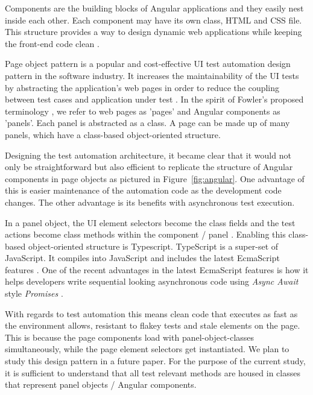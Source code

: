 \documentclass[conference]{IEEEtran}
\begin{document}
	Components are the building blocks of Angular applications and they easily nest inside each other.
	Each component may have its own class, HTML and CSS file. This structure provides a way to design dynamic web applications while keeping the front-end code clean \cite{wiki:angular}. 

	Page object pattern is a popular and cost-effective UI test automation design pattern in the software industry.
	It increases the maintainability of the UI tests by abstracting the application's web pages in order to reduce the coupling between test cases and application under test \cite{leotta2013improving}.
	In the spirit of Fowler's proposed terminology \cite{fowler:pageobject}, we refer to web pages as 'pages' and Angular components as 'panels'.
	Each panel is abstracted as a class. A page can be made up of many panels, which have a class-based object-oriented structure.   

	Designing the test automation architecture, it became clear that it would not only be straightforward but also efficient to replicate the structure of Angular components in page objects as pictured in Figure~\ref{fig:angular}.
	One advantage of this is easier maintenance of the automation code as the development code changes.
	The other advantage is its benefits with asynchronous test execution.

	In a panel object, the UI element selectors become the class fields and the test actions become class methods within the component / panel \cite{protractorstyleguide}.
	Enabling this class-based object-oriented structure is Typescript.
	TypeScript is a super-set of JavaScript. It compiles into JavaScript and includes the latest EcmaScript features \cite{wiki:typescript}.
	One of the recent advantages in the latest EcmaScript features is how it helps developers write sequential looking asynchronous code using \emph{Async Await} style \emph{Promises} \cite{wiki:ECMAscript}.

	With regards to test automation this means clean code that executes as fast as the environment allows, resistant to flakey tests \cite{fowler:flake} and stale elements on the page. 
	This is because the page components load with panel-object-classes simultaneously, while the page element selectors get instantiated.
	We plan to study this design pattern in a future paper. For the purpose of the current study, it is sufficient to understand that all test relevant methods are housed in classes that represent panel objects / Angular components.
\end{document}
